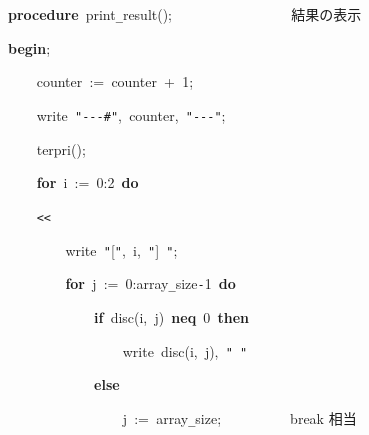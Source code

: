 \documentclass[a4paper,10pt]{article}
\def\mc{\relax}
\begin{document}
\noindent
\mbox{}\hfill

\noindent
\mbox{}\textbf{procedure}{\tt\mc \ }print{\tt\_}result();{\tt\mc \ }{\tt\mc \ }{\tt\mc \ }{\tt\mc \ }{\tt\mc \ }{\tt\mc \ }{\tt\mc \ }{\tt\mc \ }{\tt\mc \ }{\tt\mc \ }{\tt\mc \ }{\tt\mc \ }{\tt\mc \ }{\tt\mc \ }{\tt\mc \ }\rm\mc {\tt\%} \ 結果の表示 \hfill
\tt\mc 

\noindent
\mbox{}\textbf{begin};

\noindent
\mbox{}{\tt\mc \ }{\tt\mc \ }{\tt\mc \ }{\tt\mc \ }counter{\tt\mc \ }:={\tt\mc \ }counter{\tt\mc \ }+{\tt\mc \ }1;

\noindent
\mbox{}{\tt\mc \ }{\tt\mc \ }{\tt\mc \ }{\tt\mc \ }write{\tt\mc \ }{\tt "}{\tt -}{\tt -}{\tt -}{\tt\#}{\tt "},{\tt\mc \ }counter,{\tt\mc \ }{\tt "}{\tt -}{\tt -}{\tt -}{\tt "};

\noindent
\mbox{}{\tt\mc \ }{\tt\mc \ }{\tt\mc \ }{\tt\mc \ }terpri();

\noindent
\mbox{}{\tt\mc \ }{\tt\mc \ }{\tt\mc \ }{\tt\mc \ }\textbf{for}{\tt\mc \ }i{\tt\mc \ }:={\tt\mc \ }0:2{\tt\mc \ }\textbf{do}

\noindent
\mbox{}{\tt\mc \ }{\tt\mc \ }{\tt\mc \ }{\tt\mc \ }{\tt <}{\tt <}

\noindent
\mbox{}{\tt\mc \ }{\tt\mc \ }{\tt\mc \ }{\tt\mc \ }{\tt\mc \ }{\tt\mc \ }{\tt\mc \ }{\tt\mc \ }write{\tt\mc \ }{\tt "}[{\tt "},{\tt\mc \ }i,{\tt\mc \ }{\tt "}]{\tt\mc \ }{\tt "};

\noindent
\mbox{}{\tt\mc \ }{\tt\mc \ }{\tt\mc \ }{\tt\mc \ }{\tt\mc \ }{\tt\mc \ }{\tt\mc \ }{\tt\mc \ }\textbf{for}{\tt\mc \ }j{\tt\mc \ }:={\tt\mc \ }0:array{\tt\_}size{\tt -}1{\tt\mc \ }\textbf{do}

\noindent
\mbox{}{\tt\mc \ }{\tt\mc \ }{\tt\mc \ }{\tt\mc \ }{\tt\mc \ }{\tt\mc \ }{\tt\mc \ }{\tt\mc \ }{\tt\mc \ }{\tt\mc \ }{\tt\mc \ }{\tt\mc \ }\textbf{if}{\tt\mc \ }disc(i,{\tt\mc \ }j){\tt\mc \ }\textbf{neq}{\tt\mc \ }0{\tt\mc \ }\textbf{then}

\noindent
\mbox{}{\tt\mc \ }{\tt\mc \ }{\tt\mc \ }{\tt\mc \ }{\tt\mc \ }{\tt\mc \ }{\tt\mc \ }{\tt\mc \ }{\tt\mc \ }{\tt\mc \ }{\tt\mc \ }{\tt\mc \ }{\tt\mc \ }{\tt\mc \ }{\tt\mc \ }{\tt\mc \ }write{\tt\mc \ }disc(i,{\tt\mc \ }j),{\tt\mc \ }{\tt "}{\tt\mc \ }{\tt "}

\noindent
\mbox{}{\tt\mc \ }{\tt\mc \ }{\tt\mc \ }{\tt\mc \ }{\tt\mc \ }{\tt\mc \ }{\tt\mc \ }{\tt\mc \ }{\tt\mc \ }{\tt\mc \ }{\tt\mc \ }{\tt\mc \ }\textbf{else}

\noindent
\mbox{}{\tt\mc \ }{\tt\mc \ }{\tt\mc \ }{\tt\mc \ }{\tt\mc \ }{\tt\mc \ }{\tt\mc \ }{\tt\mc \ }{\tt\mc \ }{\tt\mc \ }{\tt\mc \ }{\tt\mc \ }{\tt\mc \ }{\tt\mc \ }{\tt\mc \ }{\tt\mc \ }j{\tt\mc \ }:={\tt\mc \ }array{\tt\_}size;{\tt\mc \ }{\tt\mc \ }{\tt\mc \ }{\tt\mc \ }{\tt\mc \ }{\tt\mc \ }{\tt\mc \ }{\tt\mc \ }\rm\mc {\tt\%} \ break 相当 \hfill
\tt\mc 
\end{document}
